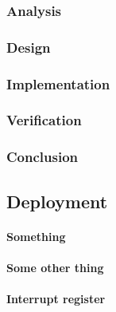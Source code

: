 \subsubsection{Analysis}
%
%
\subsubsection{Design}
%
%
\subsubsection{Implementation}
%
%
\subsubsection{Verification}
%
\subsubsection{Conclusion}



\subsection{Deployment}
\paragraph{Something}
\paragraph{Some other thing}
\paragraph{Interrupt register}
